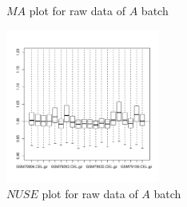 \documentclass{article}
\begin{document}
\begin{figure}[ht]
\centerline{}
\caption{$MA$ plot for raw data of $A$ batch}
\label{fig:maplot}
\end{figure}

\begin{figure}[h]
\centerline{\includegraphics[width=0.45\textwidth]{A_NUSEplot.pdf}}
\caption{$NUSE$ plot for raw data of $A$ batch}
\label{fig:nuseplot}
\end{figure}
\end{document}
